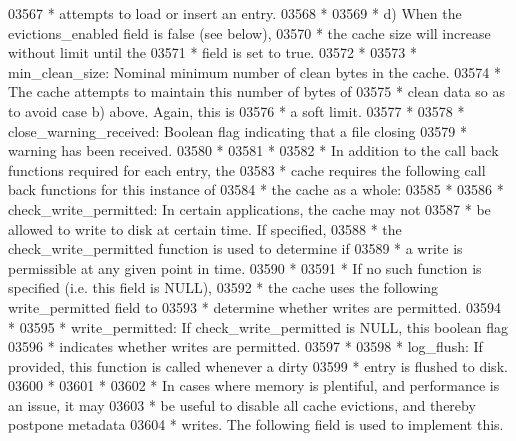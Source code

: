 \begin{DoxyCode}
03567 \textcolor{comment}{ *         attempts to load or insert an entry.}
03568 \textcolor{comment}{ *}
03569 \textcolor{comment}{ *      d) When the evictions\_enabled field is false (see below),}
03570 \textcolor{comment}{ *         the cache size will increase without limit until the}
03571 \textcolor{comment}{ *         field is set to true.}
03572 \textcolor{comment}{ *}
03573 \textcolor{comment}{ * min\_clean\_size: Nominal minimum number of clean bytes in the cache.}
03574 \textcolor{comment}{ *              The cache attempts to maintain this number of bytes of}
03575 \textcolor{comment}{ *              clean data so as to avoid case b) above.  Again, this is}
03576 \textcolor{comment}{ *              a soft limit.}
03577 \textcolor{comment}{ *}
03578 \textcolor{comment}{ * close\_warning\_received: Boolean flag indicating that a file closing }
03579 \textcolor{comment}{ *      warning has been received.}
03580 \textcolor{comment}{ *}
03581 \textcolor{comment}{ *}
03582 \textcolor{comment}{ * In addition to the call back functions required for each entry, the}
03583 \textcolor{comment}{ * cache requires the following call back functions for this instance of}
03584 \textcolor{comment}{ * the cache as a whole:}
03585 \textcolor{comment}{ *}
03586 \textcolor{comment}{ * check\_write\_permitted:  In certain applications, the cache may not}
03587 \textcolor{comment}{ *      be allowed to write to disk at certain time.  If specified,}
03588 \textcolor{comment}{ *      the check\_write\_permitted function is used to determine if}
03589 \textcolor{comment}{ *      a write is permissible at any given point in time.}
03590 \textcolor{comment}{ *}
03591 \textcolor{comment}{ *      If no such function is specified (i.e. this field is NULL),}
03592 \textcolor{comment}{ *      the cache uses the following write\_permitted field to}
03593 \textcolor{comment}{ *      determine whether writes are permitted.}
03594 \textcolor{comment}{ *}
03595 \textcolor{comment}{ * write\_permitted: If check\_write\_permitted is NULL, this boolean flag}
03596 \textcolor{comment}{ *      indicates whether writes are permitted.}
03597 \textcolor{comment}{ *}
03598 \textcolor{comment}{ * log\_flush:   If provided, this function is called whenever a dirty}
03599 \textcolor{comment}{ *      entry is flushed to disk.}
03600 \textcolor{comment}{ *}
03601 \textcolor{comment}{ *}
03602 \textcolor{comment}{ * In cases where memory is plentiful, and performance is an issue, it may}
03603 \textcolor{comment}{ * be useful to disable all cache evictions, and thereby postpone metadata}
03604 \textcolor{comment}{ * writes.  The following field is used to implement this.}

\end{DoxyCode}
